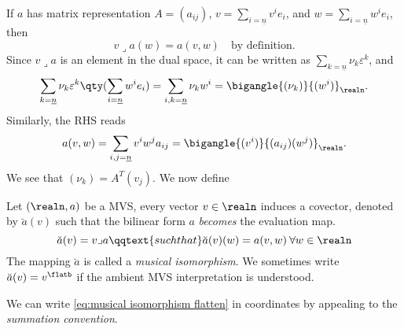 \documentclass[../main-v2-manifolds.tex]{subfiles}
\begin{document}
If $a$ has matrix representation $A = (a_{ij})$, $v = \sum_{i=\underline{n}} v^i e_i$, and $w = \sum_{i=\underline{n}} w^i e_i$, then
\[
    v\lrcorner a(w) = a(v,w)\quad\text{by definition.}
\]
Since $v\lrcorner a$ is an element in the dual space, it can be written as $\sum_{k=\underline{n}}\nu_k \varepsilon^k$, and
\[
\sum_{k=\underline{n}}\nu_k\varepsilon^k\qty(\sum_{i=\underline{n}}w^ie_i) = \sum_{i,k=\underline{n}}\nu_kw^i = \bigangle{(\nu_k)}{(w^i)}_{\realn}.
\]
Similarly, the RHS reads
\[
    a(v,w)=\sum_{i,j=\underline{n}} v^iw^ja_{ij} = \bigangle{(v^i)}{(a_{ij})(w^j)}_{\realn}.
\]
We see that $(\nu_k) = A^T (v_j)$. We now define
\begin{definition}
    Let $(\realn,a)$ be a MVS, every vector $v\in \realn$ induces a covector, denoted by $\breve{a}(v)$ such that the bilinear form $a$ \emph{becomes} the evaluation map.
    \begin{equation}
        \breve{a}(v) = v\lrcorner a\qqtext{such that}\breve{a}(v)(w) = a(v,w)\:\forall w\in \realn
        \label{eq:musical isomorphism flatten}
    \end{equation}
    The mapping $\breve{a}$ is called a \emph{musical isomorphism}. We sometimes write $\breve{a}(v) = v^{\flatb}$ if the ambient MVS interpretation is understood.
\end{definition}
We can write \cref{eq:musical isomorphism flatten} in coordinates by appealing to the \emph{summation convention}. \\
\end{document}
